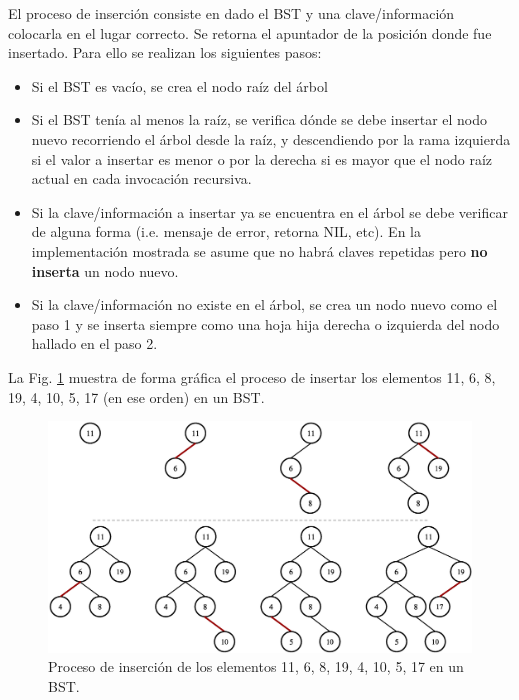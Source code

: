 El proceso de inserción consiste en dado el BST y una clave/información colocarla en el lugar correcto. Se retorna el apuntador de la posición donde fue insertado. Para ello se realizan los siguientes pasos:
\begin{itemize}
\item Si el BST es vacío, se crea el nodo raíz del árbol
\item Si el BST tenía al menos la raíz, se verifica dónde se debe insertar el nodo nuevo recorriendo el árbol desde la raíz, y descendiendo por la rama izquierda si el valor a insertar es menor o por la derecha si es mayor que el nodo raíz actual en cada invocación recursiva.
\item Si la clave/información a insertar ya se encuentra en el árbol se debe verificar de alguna forma (i.e. mensaje de error, retorna NIL, etc). En la implementación mostrada se asume que no habrá claves repetidas pero \textbf{no inserta} un nodo nuevo.
\item Si la clave/información no existe en el árbol, se crea un nodo nuevo como el paso 1 y se inserta siempre como una hoja hija derecha o izquierda del nodo hallado en el paso 2.
\end{itemize}

La Fig. \ref{fig:BSTInsert} muestra de forma gráfica el proceso de insertar los elementos 11, 6, 8, 19, 4, 10, 5, 17 (en ese orden) en un BST.

\begin{figure}[htpb!]
  \begin{center}
    \includegraphics[width=1.0\textwidth]{images/BSTInsert.eps}
  \end{center}
  \caption{Proceso de inserción de los elementos 11, 6, 8, 19, 4, 10, 5, 17 en un BST.}
  \label{fig:BSTInsert}
\end{figure}

